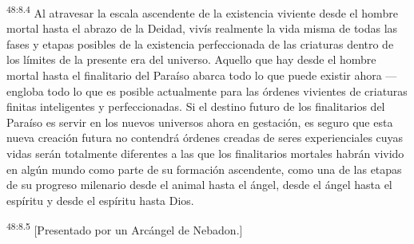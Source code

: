 \par
\textsuperscript{48:8.4} Al atravesar la escala ascendente de la existencia viviente desde el hombre mortal hasta el abrazo de la Deidad, vivís realmente la vida misma de todas las fases y etapas posibles de la existencia perfeccionada de las criaturas dentro de los límites de la presente era del universo. Aquello que hay desde el hombre mortal hasta el finalitario del Paraíso abarca todo lo que puede existir ahora ---engloba todo lo que es posible actualmente para las órdenes vivientes de criaturas finitas inteligentes y perfeccionadas. Si el destino futuro de los finalitarios del Paraíso es servir en los nuevos universos ahora en gestación, es seguro que esta nueva creación futura no contendrá órdenes creadas de seres experienciales cuyas vidas serán totalmente diferentes a las que los finalitarios mortales habrán vivido en algún mundo como parte de su formación ascendente, como una de las etapas de su progreso milenario desde el animal hasta el ángel, desde el ángel hasta el espíritu y desde el espíritu hasta Dios.

\par
\textsuperscript{48:8.5} [Presentado por un Arcángel de Nebadon.]